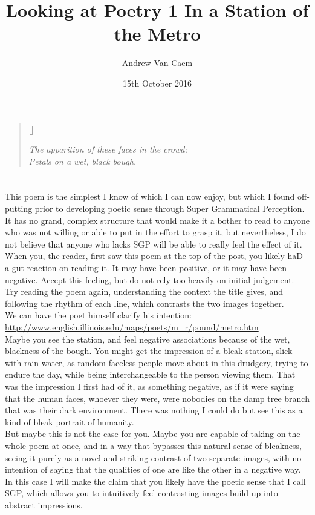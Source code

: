 \documentclass[]{article}
\title{Looking at Poetry 1 In a Station of the Metro}
\author{Andrew Van Caem}
\date{15th October 2016}
\begin{document}
\newcommand{\attrib}[1]{%
\nopagebreak{\raggedleft\footnotesize #1\par}}
\renewcommand{\poemtitlefont}{\normalfont\large\itshape\centering}

\settowidth{\versewidth}{The apparition of these faces in the crowd;}
\begin{verse}[\versewidth]

\itshape
The apparition of these faces in the crowd; \\
Petals on a wet, black bough. \\
\end{verse}
\attrib{- Ezra Pound}
\section{}
This poem is the simplest I know of which I can now enjoy, but which I found off-putting prior to developing poetic sense through Super Grammatical Perception. It has no grand, complex structure that would make it a bother to read to anyone who was not willing or able to put in the effort to grasp it, but nevertheless, I do not believe that anyone who lacks SGP will be able to really feel the effect of it.\\

When you, the reader, first saw this poem at the top of the post, you likely haD a gut reaction on reading it. It may have been positive, or it may have been negative. Accept this feeling, but do not rely too heavily on initial judgement. Try reading the poem again, understanding the context the title gives, and following the rhythm of each line, which contrasts the two images together.\\

We can have the poet himself clarify his intention:\\

\url{http://www.english.illinois.edu/maps/poets/m_r/pound/metro.htm}\\

Maybe you see the station, and feel negative associations because of the wet, blackness of the bough. You might get the impression of a bleak station, slick with rain water, as random faceless people move about in this drudgery, trying to endure the day, while being interchangeable to the person viewing them. That was the impression I first had of it, as something negative, as if it were saying that the human faces, whoever they were, were nobodies on the damp tree branch that was their dark environment. There was nothing I could do but see this as a kind of bleak portrait of humanity.\\

But maybe this is not the case for you. Maybe you are capable of taking on the whole poem at once, and in a way that bypasses this natural sense of bleakness, seeing it purely as a novel and striking contrast of two separate images, with no intention of saying that the qualities of one are like the other in a negative way.\\

In this case I will make the claim that you likely have the poetic sense that I call SGP, which allows you to intuitively feel contrasting images build up into abstract impressions.
\end{document}
